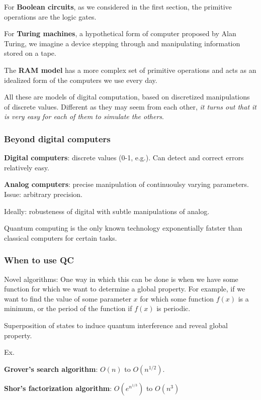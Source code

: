 \documentclass[11pt]{article}
\begin{document}
For \textbf{Boolean circuits}, as we considered in the first section,
the primitive operations are the logic gates.

For \textbf{Turing machines}, a hypothetical form of computer proposed
by Alan Turing, we imagine a device stepping through and manipulating
information stored on a tape.

The \textbf{RAM model} has a more complex set of primitive operations
and acts as an idealized form of the computers we use every day.

All these are models of digital computation, based on discretized
manipulations of discrete values. Different as they may seem from each
other, \emph{it turns out that it is very easy for each of them to
simulate the others}.

\hypertarget{beyond-digital-computers}{%
\subsubsection{Beyond digital
computers}\label{beyond-digital-computers}}

\textbf{Digital computers}: discrete values (0-1, e.g.). Can detect and
correct errors relatively easy.

\textbf{Analog computers}: precise manipulation of continuoulsy varying
parameters. Issue: arbitrary precision.

Ideally: robusteness of digital with subtle manipulations of analog.

Quantum computing is the only known technology exponentially fatster
than classical computers for certain tasks.

\hypertarget{when-to-use-qc}{%
\subsubsection{When to use QC}\label{when-to-use-qc}}

Novel algorithms: One way in which this can be done is when we have some
function for which we want to determine a global property. For example,
if we want to find the value of some parameter \(x\) for which some
function \(f(x)\) is a minimum, or the period of the function if
\(f(x)\) is periodic.

Superposition of states to induce quantum interference and reveal global
property.

Ex.

\textbf{Grover's search algorithm}: \(O(n)\) to \(O(n^{1/2})\).

\textbf{Shor's factorization algorithm}: \(O(e^{n^{1/3}})\) to
\(O(n^3)\)
\end{document}
